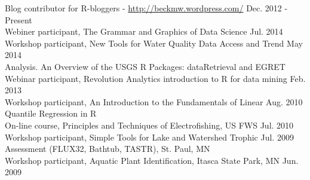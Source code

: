 \documentclass[letterpaper,12pt]{article}
\begin{document}
Blog contributor for R-bloggers - \url{http://beckmw.wordpress.com/} \hfill Dec. 2012 - Present \\
Webiner participant, The Grammar and Graphics of Data Science \hfill Jul. 2014\\
Workshop participant, New Tools for Water Quality Data Access and Trend \hfill May 2014\\ \hspace{0.3in} Analysis. An Overview of the USGS R Packages: dataRetrieval and EGRET\\
Webinar participant, Revolution Analytics introduction to R for data mining \hfill Feb. 2013 \\
Workshop participant, An Introduction to the Fundamentals of Linear \hfill Aug. 2010 \\
\hspace{0.3in}Quantile Regression in R \\
On-line course, Principles and Techniques of Electrofishing, US FWS \hfill Jul. 2010 \\
Workshop participant, Simple Tools for Lake and Watershed Trophic \hfill Jul. 2009 \\
\hspace{0.3in}Assessment (FLUX32, Bathtub, TASTR), St. Paul, MN \\
Workshop participant, Aquatic Plant Identification, Itasca State Park, MN \hfill Jun. 2009
\end{document}
